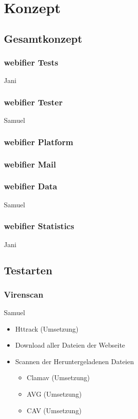\chapter{Konzept}

\section{Gesamtkonzept}

\subsection{webifier Tests}

\todo Jani

\subsection{webifier Tester}

\todo Samuel

\subsection{webifier Platform}

\subsection{webifier Mail}

\subsection{webifier Data}

\todo Samuel

\subsection{webifier Statistics}

\todo Jani

\section{Testarten}

\subsection{Virenscan}

\todo Samuel

\begin{itemize}
  \item Httrack (Umsetzung)
  \item Download aller Dateien der Webseite
  \item Scannen der Heruntergeladenen Dateien
  \begin{itemize}
    \item Clamav (Umsetzung)
    \item AVG (Umsetzung)
    \item CAV (Umsetzung)
  \end{itemize}
\end{itemize}

